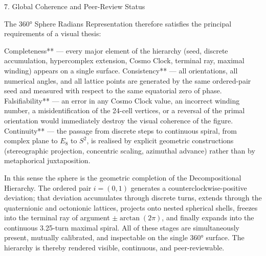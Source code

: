 7. Global Coherence and Peer-Review Status

The 360° Sphere Radians Representation therefore satisfies the principal requirements of a visual thesis:

Completeness** — every major element of the hierarchy (seed, discrete accumulation, hypercomplex extension, Cosmo Clock, terminal ray, maximal winding) appears on a single surface.  
Consistency** — all orientations, all numerical angles, and all lattice points are generated by the same ordered-pair seed and measured with respect to the same equatorial zero of phase.  
Falsifiability** — an error in any Cosmo Clock value, an incorrect winding number, a misidentification of the 24-cell vertices, or a reversal of the primal orientation would immediately destroy the visual coherence of the figure.  
Continuity** — the passage from discrete steps to continuous spiral, from complex plane to \(E_8\) to \(S^2\), is realised by explicit geometric constructions (stereographic projection, concentric scaling, azimuthal advance) rather than by metaphorical juxtaposition.

In this sense the sphere is the geometric completion of the Decompositional Hierarchy. The ordered pair \(i=(0,1)\) generates a counterclockwise-positive deviation; that deviation accumulates through discrete turns, extends through the quaternionic and octonionic lattices, projects onto nested spherical shells, freezes into the terminal ray of argument \(\pm\arctan(2\pi)\), and finally expands into the continuous 3.25-turn maximal spiral. All of these stages are simultaneously present, mutually calibrated, and inspectable on the single 360° surface. The hierarchy is thereby rendered visible, continuous, and peer-reviewable.
